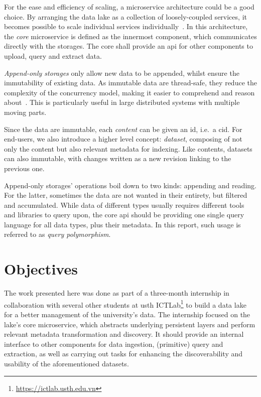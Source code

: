 \documentclass[a4paper,oneside,12pt]{book}
\begin{document}
For the ease and efficiency of scaling, a microservice architecture
could be a good choice.  By arranging the data lake as a collection
of loosely-coupled services, it becomes possible to scale individual services
individually~\cite{micro}.  In this architecture, the \emph{core} microservice
is defined as the innermost component, which communicates directly
with the storages.  The core shall provide an \gls{api} for other components
to upload, query and extract data.

\emph{Append-only storages} only allow new data to be appended, whilst ensure
the immutability of existing data.  As immutable data are thread-safe,
they reduce the complexity of the concurrency model, making it easier
to comprehend and reason about~\cite{pure}.  This is particularly useful
in large distributed systems with multiple moving parts.

Since the data are immutable, each \emph{\gls{content}} can be given
an \gls{id}, i.e.~a \gls{cid}.  For end-users, we also introduce
a higher level concept: \emph{dataset}, composing of not only the content
but also relevant metadata for indexing.  Like contents, datasets can also
immutable, with changes written as a new revision linking to the previous one.

Append-only storages' operations boil down to two kinds: appending and reading.
For the latter, sometimes the data are not wanted in their entirety,
but filtered and accumulated.  While data of different types usually requires
different tools and libraries to query upon, the core \gls{api} should be
providing one single query language for all data types, plus their metadata.
In this report, such usage is referred to as \emph{query polymorphism}.

\section{Objectives}
The work presented here was done as part of a three-month internship
in collaboration with several other students
at \gls{usth} ICTLab\footnote{\url{https://ictlab.usth.edu.vn}} to build
a data lake for a better management of the university's data.  The internship
focused on the lake's core microservice, which abstracts underlying
persistent layers and perform relevant metadata transformation and discovery.
It should provide an internal interface to other components for data ingestion,
(primitive) query and extraction, as well as carrying out tasks for enhancing
the discoverability and usability of the aforementioned datasets.
\end{document}
